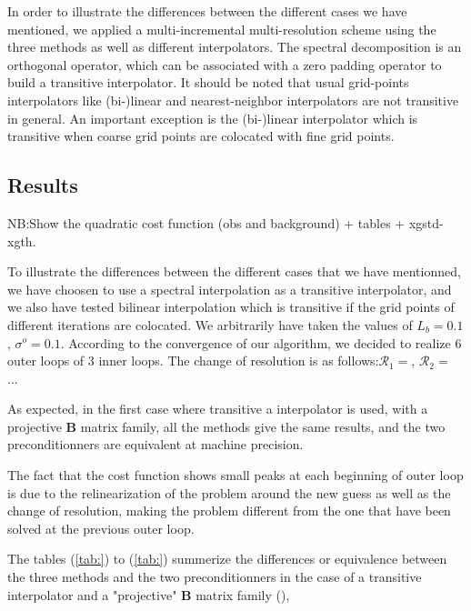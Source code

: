 \documentclass[npg, manuscript]{copernicus}
\begin{document}
In order to illustrate the differences between the different cases we have mentioned, we applied a multi-incremental multi-resolution scheme using the three methods as well as different interpolators. The spectral decomposition is an orthogonal operator, which can be associated with a zero padding operator to build a transitive interpolator. It should be noted that usual grid-points interpolators like (bi-)linear and nearest-neighbor interpolators are not transitive in general. An important exception is the (bi-)linear interpolator which is transitive when coarse grid points are colocated with fine grid points.

\subsection{Results}
NB:Show the quadratic cost function (obs and background) + tables + xgstd-xgth.

To illustrate the differences between the different cases that we have mentionned, we have choosen to use a spectral interpolation as a transitive interpolator, and we also have tested bilinear interpolation which is transitive if the grid points of different iterations are colocated. We arbitrarily have taken the values of $L_b = 0.1$, $\sigma^o=0.1$. According to the convergence of our algorithm, we decided to realize 6 outer loops of 3 inner loops. The change of resolution is as follows:$\mathcal{R}_1 = $, $\mathcal{R}_2 = $ ...

As expected, in the first case where transitive a interpolator is used, with a projective $\mathbf{B}$ matrix family, all the methods give the same results, and the two preconditionners are equivalent at machine precision.

The fact that the cost function shows small peaks at each beginning of outer loop is due to the relinearization of the problem around the new guess as well as the change of resolution, making the problem different from the one that have been solved at the previous outer loop.

The tables (\ref{tab:}) to (\ref{tab:}) summerize the differences or equivalence between the three methods and the two preconditionners in the case of a transitive interpolator and a "projective" $\mathbf{B}$ matrix family (), 





\end{document}
